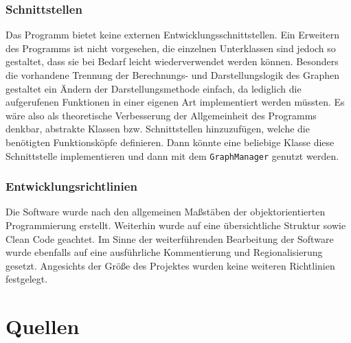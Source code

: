 \documentclass[a4paper]{article}
\begin{document}
    \subsubsection{Schnittstellen}

    Das Programm bietet keine externen Entwicklungsschnittstellen.
    Ein Erweitern des Programms ist nicht vorgesehen, die einzelnen Unterklassen sind jedoch so gestaltet, dass sie bei Bedarf leicht wiederverwendet werden können.
    Besonders die vorhandene Trennung der Berechnungs- und Darstellungslogik des Graphen gestaltet ein Ändern der Darstellungsmethode einfach, da lediglich die aufgerufenen Funktionen in einer eigenen Art implementiert werden müssten.
    Es wäre also als theoretische Verbesserung der Allgemeinheit des Programms denkbar, abstrakte Klassen bzw. Schnittstellen hinzuzufügen, welche die benötigten Funktionsköpfe definieren.
    Dann könnte eine beliebige Klasse diese Schnittstelle implementieren und dann mit dem \verb|GraphManager| genutzt werden.

    \subsubsection{Entwicklungsrichtlinien}
    
    Die Software wurde nach den allgemeinen Maßstäben der objektorientierten Programmierung erstellt.
    Weiterhin wurde auf eine übersichtliche Struktur sowie Clean Code geachtet.
    Im Sinne der weiterführenden Bearbeitung der Software wurde ebenfalls auf eine ausführliche Kommentierung und Regionalisierung gesetzt.
    Angesichts der Größe des Projektes wurden keine weiteren Richtlinien festgelegt.

\newpage
{}
\section{Quellen}
\end{document}

